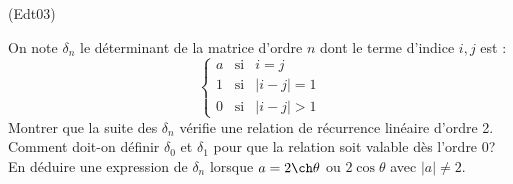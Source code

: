 \begin{tiny}(Edt03)\end{tiny}
On note $\delta _{n}$ le d{\'e}terminant de la matrice d'ordre $n$ dont le terme d'indice $i,j$ est :
\[
\left\{
\begin{array}{ccc}
a & \text{si} & i=j \\
1 & \text{si} & \left| i-j\right| =1 \\
0 & \text{si} & \left| i-j\right| >1
\end{array}
\right.
\]
Montrer que la suite des $\delta _{n}$ v{\'e}rifie une relation de r{\'e}currence lin{\'e}aire d'ordre 2. Comment doit-on définir $\delta_0$ et $\delta_1$ pour que la relation soit valable dès l'ordre $0$? En d{\'e}duire une expression de $\delta_{n}$ lorsque $a=2\ch\theta$ ou $2\cos \theta$ avec $|a|\neq 2$.